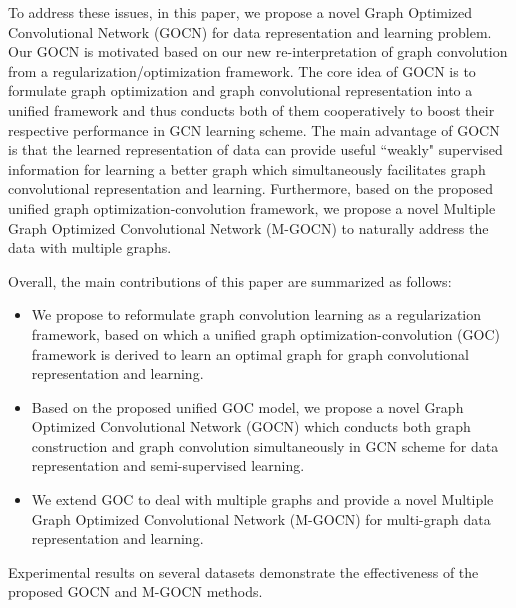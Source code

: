 \documentclass{article}
\begin{document}
To address these issues, in this paper, we propose a novel Graph Optimized Convolutional Network (GOCN) for data representation and learning problem.
Our GOCN is motivated based on our new re-interpretation of graph convolution from a regularization/optimization framework.
The core idea of GOCN is to formulate  graph optimization and graph convolutional representation into a
unified framework and thus conducts both of them cooperatively to boost their respective performance in GCN learning scheme.
The main advantage of GOCN is that the learned representation of  data
can provide useful ``weakly" supervised information for
learning a better graph which simultaneously facilitates graph convolutional representation and learning.
Furthermore, based on the proposed unified graph optimization-convolution framework, we propose  a novel Multiple Graph Optimized Convolutional Network (M-GOCN) to naturally address the data with multiple graphs.


Overall, the main contributions of this paper are summarized as follows:
\begin{itemize}
  \item  We propose to reformulate graph convolution learning as a regularization framework, based on which a unified graph optimization-convolution (GOC) framework is derived to learn an optimal graph for graph convolutional representation and learning.
 \item  Based on the proposed unified GOC model, we propose a novel Graph Optimized Convolutional Network (GOCN) which conducts both graph construction and graph  convolution simultaneously in GCN scheme for data representation and semi-supervised learning.
  \item We extend GOC to deal with multiple graphs and provide a novel Multiple Graph Optimized Convolutional Network (M-GOCN) for multi-graph data representation and learning.
\end{itemize}
Experimental results on several datasets demonstrate the effectiveness of the proposed GOCN and M-GOCN methods. 
\end{document}
